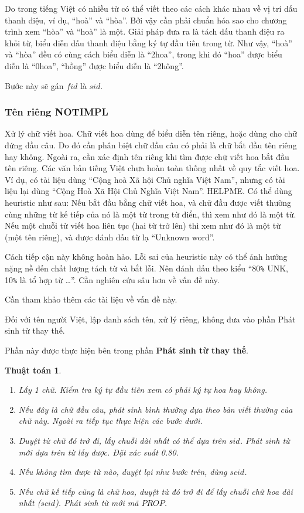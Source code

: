 \documentclass[a4paper]{book} %
\newtheorem{algo}{Thuật toán}
\begin{document}
Do trong tiếng Việt có nhiều từ có thể viết theo các
cách khác nhau về vị trí dấu thanh điệu, ví dụ, ``hoà'' và
``hòa''. Bởi vậy cần phải chuẩn hóa sao cho chương trình xem ``hòa''
và ``hoà'' là một. Giải pháp đưa ra là tách dấu thanh điệu ra khỏi
từ, biểu diễn dấu thanh điệu bằng ký tự đầu tiên trong từ. Như vậy,
``hoà'' và ``hòa'' đều có cùng cách biểu diễn là ``2hoa'', trong khi
đó ``hoa'' được biểu diễn là ``0hoa'', ``hồng'' được biểu diễn là
``2hông''.

Bước này sẽ gán $fid$ là $sid$.

\subsubsection{Tên riêng NOTIMPL}

Xử lý chữ viết hoa. Chữ viết hoa dùng để biểu diễn tên riêng, hoặc
dùng cho chữ đứng đầu câu. Do đó cần phân biệt chữ đầu câu có phải là
chữ bắt đầu tên riêng hay không. Ngoài ra, cần xác định tên riêng khi
tìm được chữ viết hoa bắt đầu tên riêng. Các văn bản tiếng Việt chưa
hoàn toàn thống nhất về quy tắc viết hoa. Ví dụ, có tài liệu dùng
``Cộng hoà Xã hội Chủ nghĩa Việt Nam'', nhưng có tài liệu lại dùng
``Cộng Hoà Xã Hội Chủ Nghĩa Việt Nam''. HELPME.
Có thể dùng heuristic như sau: Nếu bắt đầu bằng chữ viết hoa, và chữ
đầu được viết thường cùng những từ kế tiếp của nó là một từ trong từ
điển, thì xem như đó là một từ. Nếu một chuỗi từ viết hoa liên tục
(hai từ trở lên) thì xem như đó là một từ (một tên riêng), và được
đánh dấu từ lạ ``Unknown word''.

Cách tiếp cận này không hoàn hảo. Lỗi sai của heuristic này
có thể ảnh hưởng nặng nề đến chất lượng tách từ và bắt lỗi. Nên đánh
dấu theo kiểu ``80\verb#%# UNK, 10\verb#%# là tổ hợp từ \ldots''. Cần
nghiên cứu sâu hơn về vấn đề này.

Cần tham khảo thêm các tài liệu về vấn đề này.

Đối với tên người Việt, lập danh sách tên, xử lý riêng, không đưa vào
phần Phát sinh từ thay thế.

Phần này được thực hiện bên trong phần \textbf{Phát sinh từ thay thế}.

\begin{algo}
  \begin{enumerate}
  \item Lấy 1 chữ. Kiểm tra ký tự đầu tiên xem có phải ký tự hoa hay
    không.
  \item Nếu đây là chữ đầu câu, phát sinh bình thường dựa theo bản
    viết thường của chữ này. Ngoài ra tiếp tục thực hiện các bước
    dưới.
  \item Duyệt từ chữ đó trở đi, lấy chuỗi dài nhất có thể dựa trên
    $sid$. Phát sinh từ mới dựa trên từ lấy được. Đặt xác suất 0.80.
  \item Nếu không tìm được từ nào, duyệt lại như bước trên, dùng
    $scid$.
  \item Nếu chữ kế tiếp cũng là chữ hoa, duyệt từ đó trở đi để lấy
    chuỗi chữ hoa dài nhất ($scid$). Phát sinh từ mới
    mã $PROP$. 
  \end{enumerate}
\end{algo}
\end{document}
